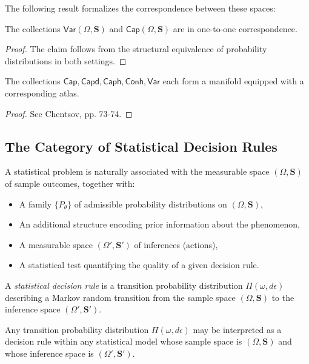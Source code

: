 The following result formalizes the correspondence between these spaces:

\begin{proposition}
    The collections $\mathsf{Var}(\Omega, \mathbf{S})$ and $\mathsf{Cap}(\Omega, \mathbf{S})$ are in one-to-one correspondence.
\end{proposition}

\begin{proof}
    The claim follows from the structural equivalence of probability distributions in both settings.
\end{proof}

\begin{proposition}
    The collections $\mathsf{Cap}, \mathsf{Capd}, \mathsf{\mathsf{Caph}}, \mathsf{\mathsf{Conh}}, \mathsf{Var}$ each form a manifold equipped with a corresponding atlas.
\end{proposition}

\begin{proof}
    See Chentsov, pp. 73-74.
\end{proof}

\subsection{The Category of Statistical Decision Rules}

A statistical problem is naturally associated with the measurable space $(\Omega, \mathbf{S})$ of sample outcomes, together with:
\begin{itemize}
    \item A family $\{P_{\theta}\}$ of admissible probability distributions on $(\Omega, \mathbf{S})$,
    \item An additional structure encoding prior information about the phenomenon,
    \item A measurable space $(\Omega', \mathbf{S'})$ of inferences (actions),
    \item A statistical test quantifying the quality of a given decision rule.
\end{itemize}

\begin{definition}
    A \emph{statistical decision rule} is a transition probability distribution $\Pi(\omega, d\epsilon)$ describing a Markov random transition from the sample space $(\Omega, \mathbf{S})$ to the inference space $(\Omega', \mathbf{S'})$.
\end{definition}

\begin{remark}
    Any transition probability distribution $\Pi(\omega, d\epsilon)$ may be interpreted as a decision rule within any statistical model whose sample space is $(\Omega, \mathbf{S})$ and whose inference space is $(\Omega', \mathbf{S'})$.
\end{remark}

